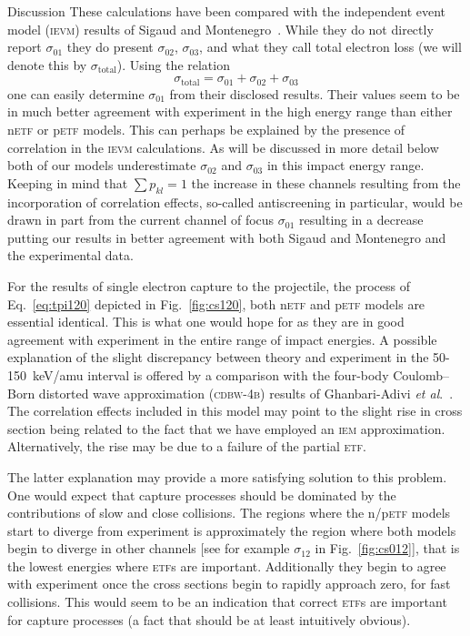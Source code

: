 \documentclass[aps, pra, reprint, groupedaddress, amsfonts, longbibliography,
               amsmath, amssymb, showpacs, nofootinbib]{revtex4-1}
\begin{document}
\begin{section}{Discussion \label{sec:disc}}
   These calculations have been compared with the independent event model (\textsc{ievm}) results of
   Sigaud and Montenegro~\cite{SM-03}. While they do not directly report $\sigma_{01}$ they do present
   $\sigma_{02}$, $\sigma_{03}$, and what they call total electron loss (we will denote this by
   $\sigma_\mathrm{total}$). Using the relation
   \begin{equation} \label{eq:total}
      \sigma_\mathrm{total} = \sigma_{01} + \sigma_{02} + \sigma_{03}
   \end{equation}
   one can easily determine $\sigma_{01}$ from their disclosed results. Their values seem to be in much
   better agreement with experiment in the high energy range than either n\textsc{etf} or p\textsc{etf}
   models. This can perhaps be explained by the presence of correlation in the \textsc{ievm}
   calculations. As will be discussed in more detail below both of our models underestimate
   $\sigma_{02}$ and $\sigma_{03}$ in this impact energy range. Keeping in mind that $\sum p_{kl} = 1$
   the increase in these channels resulting from the incorporation of correlation effects, so-called
   antiscreening in particular, would be drawn in part from the current channel of focus $\sigma_{01}$
   resulting in a decrease putting our results in better agreement with both Sigaud and Montenegro and
   the experimental data.

   For the results of single electron capture to the projectile, the process of Eq.~\eqref{eq:tpi120}
   depicted in Fig.~\ref{fig:cs120}, both n\textsc{etf} and p\textsc{etf} models are essential
   identical. This is what one would hope for as they are in good agreement with experiment in the
   entire range of impact energies. A possible explanation of the slight discrepancy between theory and
   experiment in the 50-150~keV/amu interval is offered by a comparison with the four-body Coulomb–Born
   distorted wave approximation (\textsc{cdbw-4b}) results of Ghanbari-Adivi
   \textit{et al}.~\cite{GAG15}. The correlation effects included in this model may point to the slight
   rise in cross section being related to the fact that we have employed an \textsc{iem} approximation.
   Alternatively, the rise may be due to a failure of the partial \textsc{etf}.

   The latter explanation may provide a more satisfying solution to this problem. One would expect that
   capture processes should be dominated by the contributions of slow and close collisions. The regions
   where the n/p\textsc{etf} models start to diverge from experiment is approximately the region where
   both models begin to diverge in other channels [see for example $\sigma_{12}$ in
   Fig.~\ref{fig:cs012}], that is the lowest energies where \textsc{etf}s are important.
   Additionally they begin to agree with experiment once the cross sections begin to rapidly approach
   zero, for fast collisions. This would seem to be an indication that correct \textsc{etf}s are
   important for capture processes (a fact that should be at least intuitively obvious).


\end{section}
\end{document}
